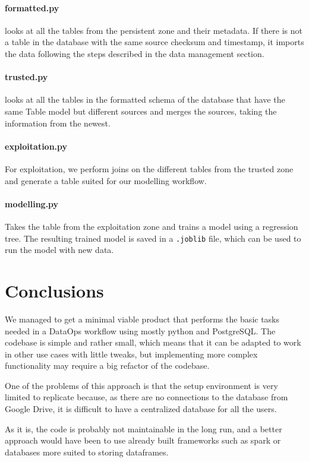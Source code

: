 \paragraph{formatted.py} looks at all the tables from the persistent zone and their metadata. If
there is not a table in the database with the same source checksum and timestamp, it imports the
data following the steps described in the data management section.

\paragraph{trusted.py} looks at all the tables in the formatted schema of the database that have the same
Table model but different sources and merges the sources, taking the information from the newest.

\paragraph{exploitation.py} For exploitation, we perform joins on the different tables from the trusted
zone and generate a table suited for our modelling workflow.

\paragraph{modelling.py} Takes the table from the exploitation zone and trains a model using a regression
tree. The resulting trained model is saved in a \texttt{.joblib} file, which can be used to run 
the model with new data.

\section{Conclusions}

We managed to get a minimal viable product that performs the basic tasks needed in a DataOps workflow
using mostly python and PostgreSQL. The codebase is simple and rather small, which means that it can be adapted to work in other use cases with little tweaks,
but implementing more complex functionality may require a big refactor of the codebase.

One of the problems of this approach is that the setup environment is very limited to replicate because, as there are no connections to the database from Google Drive, it is difficult to have a centralized database for all the users.

As it is, the code is probably not maintainable in the long run, and a better approach would have been to use
already built frameworks such as spark or databases more suited to storing dataframes.

